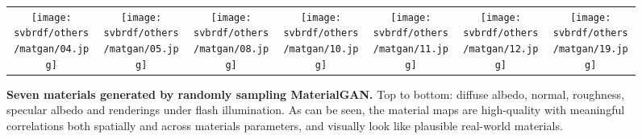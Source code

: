 \begin{figure}[h]
	\centering
	\setlength{\resLen}{0.85in}
	\addtolength{\tabcolsep}{-4pt}
	\begin{tabular}{ccccccc}
		\texttt{[image: svbrdf/others/matgan/04.jpg]} &
		\texttt{[image: svbrdf/others/matgan/05.jpg]} &
		\texttt{[image: svbrdf/others/matgan/08.jpg]} &
		\texttt{[image: svbrdf/others/matgan/10.jpg]} &
		\texttt{[image: svbrdf/others/matgan/11.jpg]} &
		\texttt{[image: svbrdf/others/matgan/12.jpg]} &
		\texttt{[image: svbrdf/others/matgan/19.jpg]}
	\end{tabular}
	\caption[Materials generated by MaterialGAN]{\label{fig:svbrdf:matgan}
		\textbf{Seven materials generated by randomly sampling MaterialGAN.} Top to bottom: diffuse albedo, normal, roughness, specular albedo and renderings under flash illumination. As can be seen, the material maps are high-quality with meaningful correlations both spatially and across materials parameters, and visually look like plausible real-world materials.
	}
\end{figure}